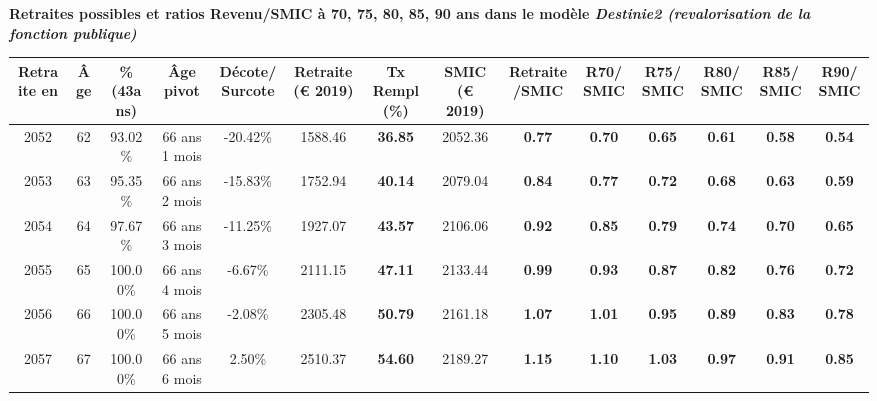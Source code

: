  \vspace{0.1cm} 
{\bf \noindent Retraites possibles et ratios Revenu/SMIC à 70, 75, 80, 85, 90 ans dans le modèle \emph{Destinie2 (revalorisation de la fonction publique)}}  
 
\begin{adjustbox}{max width=\textwidth} 
\begin{tabular}[htb]{|c|c||c|c|c||c|c||c|c||c|c|c|c|c|} 
\hline 
 Retraite en &  Âge &  \%(43ans) &  Âge pivot &  Décote/Surcote &  Retraite (\euro{} 2019) &  Tx Rempl(\%) &  SMIC (\euro{} 2019) &  Retraite/SMIC &  R70/SMIC &  R75/SMIC &  R80/SMIC &  R85/SMIC &  R90/SMIC \\ 
\hline \hline 
 2052 &  62 &  93.02\% &  66 ans 1 mois &  -20.42\% &  1588.46 &  {\bf 36.85} &  2052.36 &  {\bf {\color{red} 0.77}} &  {\bf {\color{red} 0.70}} &  {\bf {\color{red} 0.65}} &  {\bf {\color{red} 0.61}} &  {\bf {\color{red} 0.58}} &  {\bf {\color{red} 0.54}} \\ 
\hline 
 2053 &  63 &  95.35\% &  66 ans 2 mois &  -15.83\% &  1752.94 &  {\bf 40.14} &  2079.04 &  {\bf {\color{red} 0.84}} &  {\bf {\color{red} 0.77}} &  {\bf {\color{red} 0.72}} &  {\bf {\color{red} 0.68}} &  {\bf {\color{red} 0.63}} &  {\bf {\color{red} 0.59}} \\ 
\hline 
 2054 &  64 &  97.67\% &  66 ans 3 mois &  -11.25\% &  1927.07 &  {\bf 43.57} &  2106.06 &  {\bf {\color{red} 0.92}} &  {\bf {\color{red} 0.85}} &  {\bf {\color{red} 0.79}} &  {\bf {\color{red} 0.74}} &  {\bf {\color{red} 0.70}} &  {\bf {\color{red} 0.65}} \\ 
\hline 
 2055 &  65 &  100.00\% &  66 ans 4 mois &  -6.67\% &  2111.15 &  {\bf 47.11} &  2133.44 &  {\bf {\color{red} 0.99}} &  {\bf {\color{red} 0.93}} &  {\bf {\color{red} 0.87}} &  {\bf {\color{red} 0.82}} &  {\bf {\color{red} 0.76}} &  {\bf {\color{red} 0.72}} \\ 
\hline 
 2056 &  66 &  100.00\% &  66 ans 5 mois &  -2.08\% &  2305.48 &  {\bf 50.79} &  2161.18 &  {\bf 1.07} &  {\bf 1.01} &  {\bf {\color{red} 0.95}} &  {\bf {\color{red} 0.89}} &  {\bf {\color{red} 0.83}} &  {\bf {\color{red} 0.78}} \\ 
\hline 
 2057 &  67 &  100.00\% &  66 ans 6 mois &  2.50\% &  2510.37 &  {\bf 54.60} &  2189.27 &  {\bf 1.15} &  {\bf 1.10} &  {\bf 1.03} &  {\bf {\color{red} 0.97}} &  {\bf {\color{red} 0.91}} &  {\bf {\color{red} 0.85}} \\ 
\hline 
\hline 
\end{tabular} 
\end{adjustbox} 
 
